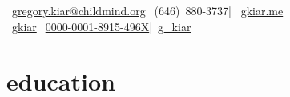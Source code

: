 \documentclass[]{friggeri-cv} %
\begin{document}
{{\color{red} \faEnvelope[regular]}~\href{mailto:gregory.kiar@childmind.org}{gregory.kiar@childmind.org}\quad|\quad {\color{brown}\faMobile*}~(646)~880-3737\quad | \quad {\color{lightgray} \faGlobe}~\href{https://gkiar.me}{gkiar.me} \\ {\color{purple}\faGithub}~\href{https://github.com/gkiar}{gkiar}\quad|\quad{\color{orcidgreen}\faOrcid}~\href{http://orcid.org/0000-0001-8915-496X}{0000-0001-8915-496X}\quad|\quad {\color{blue}\faTwitter}~\href{https://twitter.com/g_kiar}{g\_kiar}} %

% 
%



\section{education}
\end{document}
